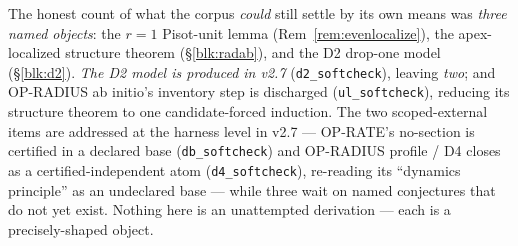 \documentclass[11pt]{article}
\theoremstyle{plain}
\theoremstyle{definition}
\theoremstyle{remark}
\begin{document}
\noindent The honest count of what the corpus \emph{could} still settle by its own
means was \emph{three named objects}: the $r=1$ Pisot-unit lemma
(Rem~\ref{rem:evenlocalize}), the apex-localized structure theorem
(\S\ref{blk:radab}), and the D2 drop-one model (\S\ref{blk:d2}). \emph{The D2 model
is produced in v2.7} (\texttt{d2\_softcheck}), leaving \emph{two}; and OP-RADIUS ab
initio's inventory step is discharged (\texttt{ul\_softcheck}), reducing its
structure theorem to one candidate-forced induction. The two scoped-external items
are addressed at the harness level in v2.7 --- OP-RATE's no-section is certified in a
declared base (\texttt{db\_softcheck}) and OP-RADIUS profile / D4 closes as a
certified-independent atom (\texttt{d4\_softcheck}), re-reading its ``dynamics
principle'' as an undeclared base --- while three wait on named conjectures that do
not yet exist. Nothing here is an unattempted derivation --- each is a
precisely-shaped object.
\end{document}
